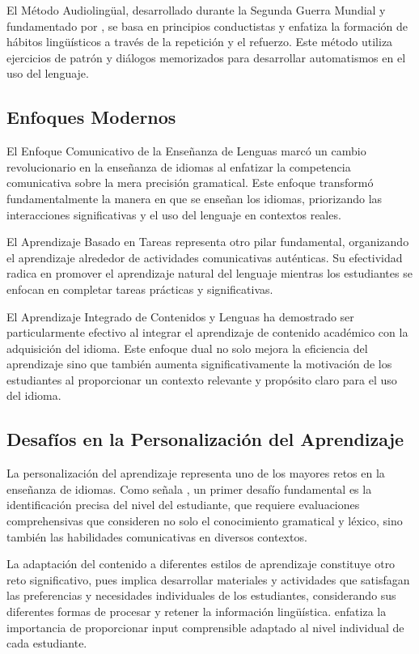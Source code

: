 El Método Audiolingüal, desarrollado durante la Segunda Guerra Mundial y fundamentado por \cite{fries1945teaching}, se basa en principios conductistas y enfatiza la formación de hábitos lingüísticos a través de la repetición y el refuerzo. Este método utiliza ejercicios de patrón y diálogos memorizados para desarrollar automatismos en el uso del lenguaje.

\subsection{Enfoques Modernos}

El Enfoque Comunicativo de la Enseñanza de Lenguas \cite{hymes1972communicative} marcó un cambio revolucionario en la enseñanza de idiomas al enfatizar la competencia comunicativa sobre la mera precisión gramatical. Este enfoque transformó fundamentalmente la manera en que se enseñan los idiomas, priorizando las interacciones significativas y el uso del lenguaje en contextos reales.

El Aprendizaje Basado en Tareas \cite{nunan1989designing} representa otro pilar fundamental, organizando el aprendizaje alrededor de actividades comunicativas auténticas. Su efectividad radica en promover el aprendizaje natural del lenguaje mientras los estudiantes se enfocan en completar tareas prácticas y significativas.

El Aprendizaje Integrado de Contenidos y Lenguas \cite{coyle2010clil} ha demostrado ser particularmente efectivo al integrar el aprendizaje de contenido académico con la adquisición del idioma. Este enfoque dual no solo mejora la eficiencia del aprendizaje sino que también aumenta significativamente la motivación de los estudiantes al proporcionar un contexto relevante y propósito claro para el uso del idioma.

\subsection{Desafíos en la Personalización del Aprendizaje}

La personalización del aprendizaje representa uno de los mayores retos en la enseñanza de idiomas. Como señala \cite{ellis1994study}, un primer desafío fundamental es la identificación precisa del nivel del estudiante, que requiere evaluaciones comprehensivas que consideren no solo el conocimiento gramatical y léxico, sino también las habilidades comunicativas en diversos contextos.

La adaptación del contenido a diferentes estilos de aprendizaje constituye otro reto significativo, pues implica desarrollar materiales y actividades que satisfagan las preferencias y necesidades individuales de los estudiantes, considerando sus diferentes formas de procesar y retener la información lingüística. \cite{krashen1982principles} enfatiza la importancia de proporcionar input comprensible adaptado al nivel individual de cada estudiante.

